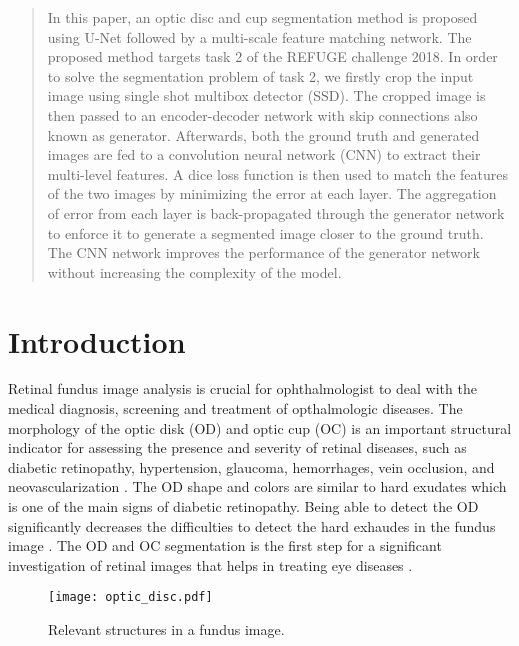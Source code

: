 \documentclass[runningheads,a4paper]{llncs}
\begin{document}
\maketitle
\begin{abstract}
In this paper, an optic disc and cup segmentation method is proposed using U-Net followed by a multi-scale feature matching network. The proposed method targets task 2 of the REFUGE challenge 2018. In order to solve the segmentation problem of task 2, we firstly crop the input image using single shot multibox detector (SSD). The cropped image is then passed to an encoder-decoder network with skip connections also known as generator. Afterwards, both the ground truth and generated images are fed to a convolution neural network (CNN) to extract their multi-level features. A dice loss function is then used to match the features of the two images by minimizing the error at each layer. The aggregation of error from each layer is back-propagated through the generator network to enforce it to generate a segmented image closer to the ground truth. The CNN network improves the performance of the generator network without increasing the complexity of the model.
\end{abstract}

\section{Introduction}

Retinal fundus image analysis is crucial for ophthalmologist to deal with the medical diagnosis, screening and treatment of opthalmologic diseases. The morphology of the optic disk (OD) and optic cup (OC) is an important structural indicator for assessing the presence and severity of retinal diseases, such as diabetic retinopathy, hypertension, glaucoma, hemorrhages, vein occlusion, and neovascularization \cite{macgillivray2014retinal}. The OD shape and colors are similar to hard exudates which is one of the main signs of diabetic retinopathy. Being able to detect the OD significantly decreases the difficulties to detect the hard exhaudes in the fundus image \cite{saleh2018learning}.
The OD and OC segmentation is the first step for a significant investigation of retinal images that helps in treating eye diseases \cite{almazroa2015optic}. 

\begin{figure}[htp]
\centering
\texttt{[image: optic\_disc.pdf]}
\caption{Relevant structures in a fundus image.}
\label{fig:figD}
\end{figure}
\end{document}
